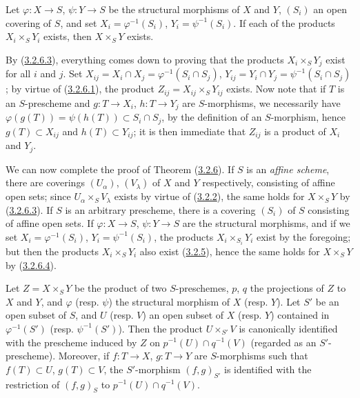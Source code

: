 \begin{lemma}[3.2.6.4]
\label{I.3.2.6.4}
Let $\varphi:X\to S$, $\psi:Y\to S$ be the structural morphisms of $X$
and $Y$, $(S_i)$ an open covering of $S$, and set
$X_i=\varphi^{-1}(S_i)$, $Y_i=\psi^{-1}(S_i)$. If each of the products
$X_i\times_S Y_i$ exists, then $X\times_S Y$ exists.
\end{lemma}

By (\hyperref[I.3.2.6.3]{3.2.6.3}), everything comes down to proving that the
products $X_i\times_S Y_j$ exist for all $i$ and $j$. Set
$X_{ij}=X_i\cap X_j=\varphi^{-1}(S_i\cap S_j)$,
$Y_{ij}=Y_i\cap Y_j=\psi^{-1}(S_i\cap S_j)$; by virtue of
(\hyperref[I.3.2.6.1]{3.2.6.1}), the product
$Z_{ij}=X_{ij}\times_S Y_{ij}$ exists. Now note that if $T$ is an
$S$-prescheme and $g:T\to X_i$, $h:T\to Y_j$ are $S$-morphisms, we
necessarily have
$\varphi(g(T))=\psi(h(T))\subset S_i\cap S_j$, by the definition of an
$S$-morphism, hence $g(T)\subset X_{ij}$ and $h(T)\subset Y_{ij}$; it is
then immediate that $Z_{ij}$ is a product of $X_i$ and $Y_j$.

\begin{env}[3.2.6.5]
\label{I.3.2.6.5}
We can now complete the proof of Theorem
(\hyperref[I.3.2.6]{3.2.6}). If $S$ is an \emph{affine scheme}, there are
coverings $(U_\alpha)$, $(V_\lambda)$ of $X$ and $Y$ respectively,
consisting of affine open sets; since $U_\alpha\times_S V_\lambda$ exists by
virtue of (\hyperref[I.3.2.2]{3.2.2}), the same holds for
$X\times_S Y$ by (\hyperref[I.3.2.6.3]{3.2.6.3}). If $S$ is an
arbitrary prescheme, there is a covering $(S_i)$ of $S$ consisting of affine
open sets. If $\varphi:X\to S$, $\psi:Y\to S$ are the structural
morphisms, and if we set $X_i=\varphi^{-1}(S_i)$,
$Y_i=\psi^{-1}(S_i)$, the products $X_i\times_{S_i}Y_i$ exist by the
foregoing; but then the products $X_i\times_S Y_i$ also exist
(\hyperref[I.3.2.5]{3.2.5}), hence the same holds for $X\times_S Y$ by
(\hyperref[I.3.2.6.4]{3.2.6.4}).
\end{env}

\begin{corollary}[3.2.7]
\label{I.3.2.7}
Let $Z=X\times_S Y$ be the product of two $S$-preschemes, $p$, $q$ the
projections of $Z$ to $X$ and $Y$, and $\varphi$ (resp. $\psi$) the structural
morphism of $X$ (resp. $Y$). Let $S'$ be an open subset of $S$, and $U$
(resp. $V$) an open subset of $X$ (resp. $Y$) contained in
$\varphi^{-1}(S')$ (resp. $\psi^{-1}(S')$). Then the product
$U\times_{S'}V$ is canonically identified with the prescheme induced by $Z$ on
$p^{-1}(U)\cap q^{-1}(V)$ (regarded as an $S'$-prescheme). Moreover, if
$f:T\to X$, $g:T\to Y$ are $S$-morphisms such that $f(T)\subset U$,
$g(T)\subset V$, the $S'$-morphism $(f,g)_{S'}$ is identified with the
restriction of $(f,g)_S$ to $p^{-1}(U)\cap q^{-1}(V)$.
\end{corollary}

